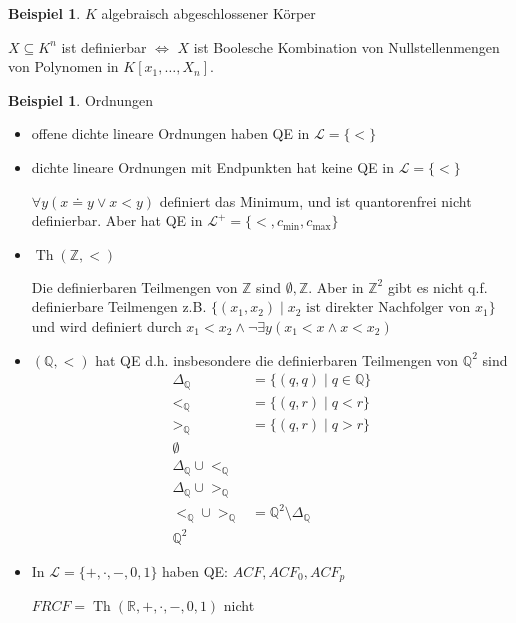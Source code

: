 \documentclass[12pt,parskip=full]{scrartcl}
\newcommand{\setZ}{\mathbb{Z}}
\newcommand{\setQ}{\mathbb{Q}}
\newcommand{\setR}{\mathbb{R}}
\theoremstyle{definition}
\newtheorem{example}[theorem]{Beispiel}
\begin{document}
	\begin{example}
		$K$ algebraisch abgeschlossener Körper
		
		$X \subseteq K^n$ ist definierbar $\Leftrightarrow$ $X$ ist Boolesche Kombination von Nullstellenmengen von Polynomen in $K[x_1, \dots, X_n]$.
	\end{example}

	\begin{example}
		Ordnungen
		\begin{itemize}
			\item offene dichte lineare Ordnungen haben QE in $\mathcal{L} = \{ < \}$
			\item dichte lineare Ordnungen mit Endpunkten hat keine QE in $\mathcal{L} = \{ < \}$
			
			$\forall y (x \doteq y \lor x < y)$ definiert das Minimum, und ist quantorenfrei nicht definierbar. Aber hat QE in $\mathcal{L}^+ = \{ <, c_\text{min}, c_\text{max} \}$
			\item $\operatorname{Th}(\setZ, <)$
			
			Die definierbaren Teilmengen von $\setZ$ sind $\emptyset, \setZ$. Aber in $\setZ^2$ gibt es nicht q.f. definierbare Teilmengen z.B. $\{ (x_1, x_2) \mid \text{$x_2$ ist direkter Nachfolger von $x_1$} \}$ und wird definiert durch $x_1 < x_2 \land \lnot \exists y (x_1 < x \land x < x_2)$
			
			\item $(\setQ, <)$ hat QE d.h. insbesondere die definierbaren Teilmengen von $\setQ^2$ sind
			\begin{align*}
				\Delta_\setQ &= \{ (q,q) \mid q \in \setQ \} \\
				<_\setQ &= \{ (q,r) \mid q < r \} \\
				>_\setQ &= \{ (q,r) \mid q > r \} \\
				\emptyset \\
				\Delta_\setQ \cup <_\setQ \\
				\Delta_\setQ \cup >_\setQ \\
				<_\setQ \cup >_\setQ &= \setQ^2 \setminus \Delta_\setQ \\
				\setQ^2
			\end{align*}
			\item In $\mathcal{L} = \{ +, \cdot, -, 0, 1 \}$ haben QE: $ACF, ACF_0, ACF_p$
			
			$FRCF = \operatorname{Th}(\setR, +, \cdot, -, 0, 1)$ nicht
		\end{itemize}
	\end{example}
\end{document}
